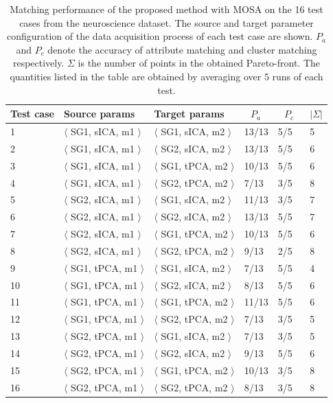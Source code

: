 \begin{table}[tbh]
\begin{center}
\begin{tabular}{l|l|l|l|l|l}
\hline
Test case & Source params & Target params & $~~~P_a~~~$ & $~~~P_c~~~$ & $|\Sigma|$\\
\hline
1		&	$\langle$	SG1, sICA, m1	$\rangle$	&	$\langle$	SG1, sICA, m2	$\rangle$	&		13/13	&	5/5	&	5	 \\
2		&	$\langle$	SG1, sICA, m1	$\rangle$	&	$\langle$	SG2, sICA, m2	$\rangle$	&		13/13	&	5/5	&	6	 \\
3		&	$\langle$	SG1, sICA, m1	$\rangle$	&	$\langle$	SG1, tPCA, m2	$\rangle$	&		10/13	&	5/5	&	6	 \\
4		&	$\langle$	SG1, sICA, m1	$\rangle$	&	$\langle$	SG2, tPCA, m2	$\rangle$	&		7/13	&	3/5	&	8	 \\
5		&	$\langle$	SG2, sICA, m1	$\rangle$	&	$\langle$	SG1, sICA, m2	$\rangle$	&		11/13	&	3/5	&	7	 \\
6		&	$\langle$	SG2, sICA, m1	$\rangle$	&	$\langle$	SG2, sICA, m2	$\rangle$	&		13/13	&	5/5	&	7	 \\
7		&	$\langle$	SG2, sICA, m1	$\rangle$	&	$\langle$	SG1, tPCA, m2	$\rangle$	&		10/13	&	5/5	&	6	 \\
8		&	$\langle$	SG2, sICA, m1	$\rangle$	&	$\langle$	SG2, tPCA, m2	$\rangle$	&		9/13	&	2/5	&	8	 \\
9		&	$\langle$	SG1, tPCA, m1	$\rangle$	&	$\langle$	SG1, sICA, m2	$\rangle$	&		7/13	&	5/5	&	4	 \\
10		&	$\langle$	SG1, tPCA, m1	$\rangle$	&	$\langle$	SG2, sICA, m2	$\rangle$	&		8/13	&	5/5	&	6	 \\
11		&	$\langle$	SG1, tPCA, m1	$\rangle$	&	$\langle$	SG1, tPCA, m2	$\rangle$	&		11/13	&	5/5	&	6	 \\
12		&	$\langle$	SG1, tPCA, m1	$\rangle$	&	$\langle$	SG2, tPCA, m2	$\rangle$	&		7/13	&	3/5	&	5	 \\
13		&	$\langle$	SG2, tPCA, m1	$\rangle$	&	$\langle$	SG1, sICA, m2	$\rangle$	&		7/13	&	3/5	&	5	 \\
14		&	$\langle$	SG2, tPCA, m1	$\rangle$	&	$\langle$	SG2, sICA, m2	$\rangle$	&		9/13	&	5/5	&	6	 \\
15		&	$\langle$	SG2, tPCA, m1	$\rangle$	&	$\langle$	SG1, tPCA, m2	$\rangle$	&		10/13	&	3/5	&	8	 \\
16		&	$\langle$	SG2, tPCA, m1	$\rangle$	&	$\langle$	SG2, tPCA, m2	$\rangle$	&		8/13	&	3/5	&	8	 \\
\hline
\end{tabular}
\end{center}
\caption[The performance of MOSA on the neuroscience dataset]{\label{tbl:nemo_perf} Matching performance of the proposed method with MOSA on the 16 test cases from the neuroscience dataset. The source and target parameter configuration of the data acquisition process of each test case are shown. $P_a$ and $P_c$ denote the accuracy of attribute matching and cluster matching respectively. $\Sigma$ is the number of points in the obtained Pareto-front. The quantities listed in the table are obtained by averaging over 5 runs of each test.}
\end{table}

